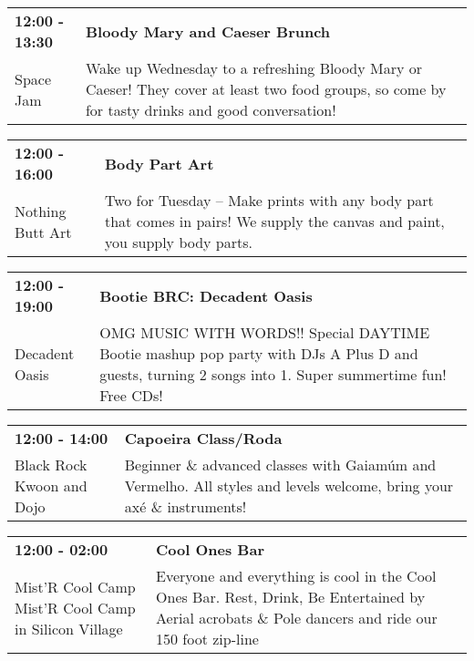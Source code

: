 \begin{tabular}{ p{1in} p{2.2in} }
    \textbf{12:00 - 13:30} & \textbf{Bloody Mary and Caeser Brunch} \\
    Space Jam \newline  & Wake up Wednesday to a refreshing Bloody Mary or Caeser! They cover at least two food groups, so come by for tasty drinks and good conversation! \\
    \hline 
\end{tabular}
    
\begin{tabular}{ p{1in} p{2.2in} }
    \textbf{12:00 - 16:00} & \textbf{Body Part Art} \\
    Nothing Butt Art \newline  & Two for Tuesday -- Make prints with any body part that comes in pairs! We supply the canvas and paint, you supply body parts. \\
    \hline 
\end{tabular}
    
\begin{tabular}{ p{1in} p{2.2in} }
    \textbf{12:00 - 19:00} & \textbf{Bootie BRC: Decadent Oasis} \\
    Decadent Oasis \newline  & OMG MUSIC WITH WORDS!! Special DAYTIME Bootie mashup pop party with DJs A Plus D and guests, turning 2 songs into 1. Super summertime fun! Free CDs! \\
    \hline 
\end{tabular}
    
\begin{tabular}{ p{1in} p{2.2in} }
    \textbf{12:00 - 14:00} & \textbf{Capoeira Class/Roda} \\
    Black Rock Kwoon and Dojo \newline  & Beginner \& advanced classes with Gaiam\'um and Vermelho. All styles and levels welcome, bring your ax\'e \& instruments! \\
    \hline 
\end{tabular}
    
\begin{tabular}{ p{1in} p{2.2in} }
    \textbf{12:00 - 02:00} & \textbf{Cool Ones Bar } \\
    Mist'R Cool Camp \newline Mist'R Cool Camp in Silicon Village & Everyone and everything is cool in the Cool Ones Bar. Rest, Drink, Be Entertained by Aerial acrobats \& Pole dancers and ride our 150 foot zip-line \\
    \hline 
\end{tabular}
    
